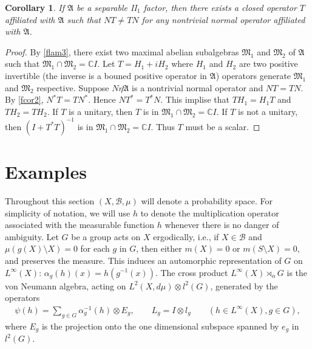\documentclass[a4paper,10pt]{amsart}
\newtheorem{corollary}{Corollary}[section]
\newcommand{\AAA}{\mathfrak A}
\newcommand{\C}{\mathbb C} %
\begin{document}
\begin{corollary}\label{fcor6}
   If $\AAA$ be a separable II$_1$ factor, then there exists 
   a closed operator $T$ affiliated with $\AAA$ such that 
   $NT \neq TN$ for any nontrivial normal operator affiliated with 
   $\AAA$.
\end{corollary}
\begin{proof}
    By \cref{flam3}, there exist two maximal abelian
    subalgebras $\mathfrak{M}_1$ and $\mathfrak{M}_2$ of $\AAA$ such that 
    $\mathfrak{M}_1 \cap \mathfrak{M}_2 = 
    \C I$. Let $T = H_1 + iH_2$ where $H_1$ and $H_2$ are two positive 
    invertible (the inverse is a bouned positive operator in $\AAA$) operators
    generate $\mathfrak{M}_1$ and $\mathfrak{M}_2$ respective. 
    Suppose $N \eta \AAA$ is a nontrivial
    normal operator and $NT = TN$. By \cref{fcor2}, 
    $N^{*}T = TN^{*}$. Hence $NT^{*} = T^{*}N$. 
    This implise that $TH_1 = H_1 T$ and $TH_2 = TH_2$.
    If $T$ is a unitary, then $T$ is in $\mathfrak{M}_1 \cap \mathfrak{M}_2 = \C I$.
    If $T$ is not a unitary, then $(I+T^{*}T)^{-1}$ is in
    $\mathfrak{M}_1 \cap \mathfrak{M}_2 = \C I$. Thus $T$ must be a scalar. 
\end{proof}

\section{Examples}
Throughout this section $(X, \mathcal{B}, \mu)$ will denote a 
probability space. 
For simplicity of notation, we will use $h$ to denote the 
multiplication operator associated with the measurable function $h$
whenever there is no danger of ambiguity.
Let $G$ be a group acts on
$X$ ergodically, i.e., if $X \in \mathcal{B}$ and $\mu(g(X)\setminus X) = 0$ for 
each $g$ in $G$, then either $m(X) = 0$ or $m(S \setminus X) = 0$, and 
preserves the measure.
This induces 
an automorphic representation of $G$ on $L^{\infty}(X)$: 
$\alpha_{g}(h)(x) = h(g^{-1}(x))$. The cross product 
$L^{\infty}(X) \rtimes_{\alpha} G$ is the von Neumann algebra, acting on 
$L^{2}(X, d\mu) \otimes l^{2}(G)$, generated by the operators
\begin{align*}
    \psi(h) = \sum_{g \in G}\alpha_{g}^{-1}(h) \otimes E_{g}, 
    \qquad L_g = I \otimes l_g \qquad (h \in L^{\infty}(X), g \in G),
\end{align*}
where $E_g$ is the projection onto the one dimensional subspace 
spanned by $e_{g}$ in $l^{2}(G)$. 
\end{document}
